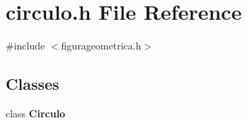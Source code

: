 \section{circulo.\+h File Reference}
\label{circulo_8h}
{\ttfamily \#include $<$figurageometrica.\+h$>$}\newline
\subsection*{Classes}
\begin{DoxyCompactItemize}
\item 
class \textbf{ Circulo}
\end{DoxyCompactItemize}
